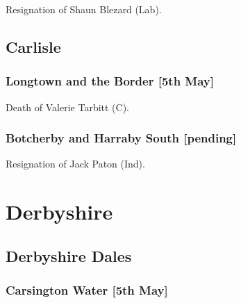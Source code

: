 \documentclass[a4paper,openany]{book}
\begin{document}
\begin{resultsiii}

Resignation of Shaun Blezard (Lab).

\subsection*{Carlisle}

\subsubsection*{Longtown and the Border \hspace*{\fill}\nolinebreak[1]%
	\enspace\hspace*{\fill}
	[5th May]}


Death of Valerie Tarbitt (C).

\subsubsection*{Botcherby and Harraby South \hspace*{\fill}\nolinebreak[1]%
	\enspace\hspace*{\fill}
	[pending]}


Resignation of Jack Paton (Ind).

\section{Derbyshire}

\subsection*{Derbyshire Dales}

\subsubsection*{Carsington Water \hspace*{\fill}\nolinebreak[1]%
	\enspace\hspace*{\fill}
	[5th May]}



\end{resultsiii}
\end{document}
